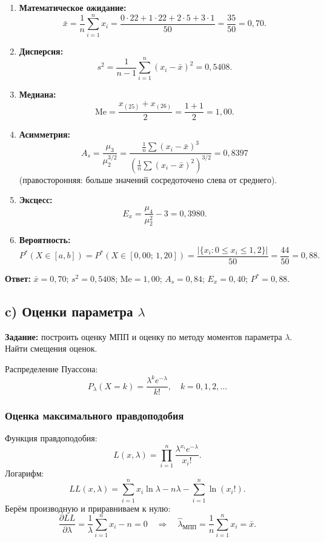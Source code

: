 \documentclass[12pt,a4paper]{article}
\newcommand{\lahat}{\hat{\lambda}}
\newcommand{\xbar}{\bar{x}}
\begin{document}
	\begin{enumerate}
		\item \textbf{Математическое ожидание:}
		\[
		\xbar = \frac{1}{n}\sum_{i=1}^n x_i
		= \frac{0\cdot22 + 1\cdot22 + 2\cdot5 + 3\cdot1}{50} = \frac{35}{50} = 0{,}70.
		\]
		
		\item \textbf{Дисперсия:}
		\[
		s^2 = \frac{1}{n-1}\sum_{i=1}^n(x_i-\xbar)^2 = 0{,}5408.
		\]
		
		\item \textbf{Медиана:}
		\[
		\mathrm{Me} = \frac{x_{(25)}+x_{(26)}}{2} = \frac{1+1}{2} = 1{,}00.
		\]
		
		\item \textbf{Асимметрия:}
		\[
		A_s = \frac{\mu_3}{\mu_2^{3/2}} = \frac{\frac{1}{n}\sum(x_i-\xbar)^3}
		{\left(\frac{1}{n}\sum(x_i-\xbar)^2\right)^{3/2}} = 0{,}8397
		\]
		(правосторонняя: больше значений сосредоточено слева от среднего).
		
		\item \textbf{Эксцесс:}
		\[
		E_x = \frac{\mu_4}{\mu_2^2} - 3 = 0{,}3980.
		\]
		
		\item \textbf{Вероятность:}
		\[
		P^*(X \in [a,b]) = P^*(X \in [0{,}00;\,1{,}20])
		= \frac{|\{x_i : 0 \le x_i \le 1{,}2\}|}{50} = \frac{44}{50} = 0{,}88.
		\]
	\end{enumerate}
	
	\textbf{Ответ:} $\xbar = 0{,}70$;\; $s^2 = 0{,}5408$;\;
	$\mathrm{Me} = 1{,}00$;\; $A_s = 0{,}84$;\; $E_x = 0{,}40$;\;
	$P^* = 0{,}88$.
	
	\subsection{c) Оценки параметра \texorpdfstring{$\lambda$}{lambda}}
	
	\textbf{Задание:} построить оценку МПП и оценку по методу моментов
	параметра $\lambda$. Найти смещения оценок.
	
	Распределение Пуассона:
	\[
	P_\lambda(X=k) = \frac{\lambda^k e^{-\lambda}}{k!},\quad k=0,1,2,\ldots
	\]
	
	\subsubsection*{Оценка максимального правдоподобия}
	
	Функция правдоподобия:
	\[
	L(x,\lambda) = \prod_{i=1}^n \frac{\lambda^{x_i}e^{-\lambda}}{x_i!}.
	\]
	Логарифм:
	\[
	LL(x,\lambda) = \sum_{i=1}^n x_i\ln\lambda - n\lambda - \sum_{i=1}^n\ln(x_i!).
	\]
	Берём производную и приравниваем к нулю:
	\[
	\frac{\partial LL}{\partial\lambda} = \frac{1}{\lambda}\sum_{i=1}^n x_i - n = 0
	\quad\Rightarrow\quad
	\lahat_{\text{МПП}} = \frac{1}{n}\sum_{i=1}^n x_i = \xbar.
	\]
	
\end{document}

